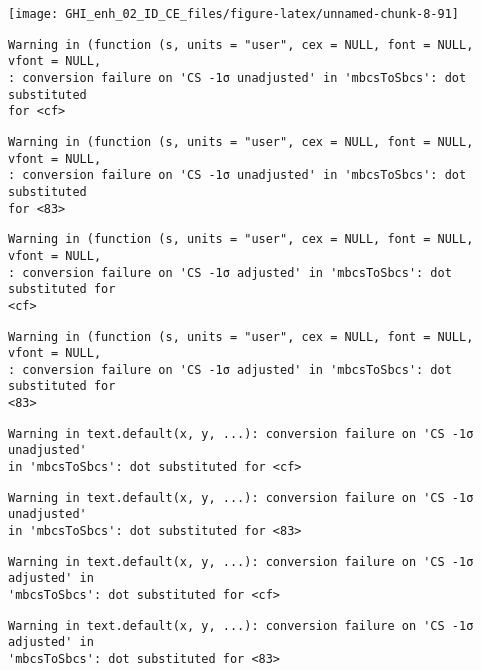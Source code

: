 \documentclass[
  10pt,
  a4paper,oneside]{article}
\begin{document}
\begin{center}\texttt{[image: GHI\_enh\_02\_ID\_CE\_files/figure-latex/unnamed-chunk-8-91]} \end{center}

\begin{verbatim}
Warning in (function (s, units = "user", cex = NULL, font = NULL, vfont = NULL,
: conversion failure on 'CS -1σ unadjusted' in 'mbcsToSbcs': dot substituted
for <cf>
\end{verbatim}

\begin{verbatim}
Warning in (function (s, units = "user", cex = NULL, font = NULL, vfont = NULL,
: conversion failure on 'CS -1σ unadjusted' in 'mbcsToSbcs': dot substituted
for <83>
\end{verbatim}

\begin{verbatim}
Warning in (function (s, units = "user", cex = NULL, font = NULL, vfont = NULL,
: conversion failure on 'CS -1σ adjusted' in 'mbcsToSbcs': dot substituted for
<cf>
\end{verbatim}

\begin{verbatim}
Warning in (function (s, units = "user", cex = NULL, font = NULL, vfont = NULL,
: conversion failure on 'CS -1σ adjusted' in 'mbcsToSbcs': dot substituted for
<83>
\end{verbatim}

\begin{verbatim}
Warning in text.default(x, y, ...): conversion failure on 'CS -1σ unadjusted'
in 'mbcsToSbcs': dot substituted for <cf>
\end{verbatim}

\begin{verbatim}
Warning in text.default(x, y, ...): conversion failure on 'CS -1σ unadjusted'
in 'mbcsToSbcs': dot substituted for <83>
\end{verbatim}

\begin{verbatim}
Warning in text.default(x, y, ...): conversion failure on 'CS -1σ adjusted' in
'mbcsToSbcs': dot substituted for <cf>
\end{verbatim}

\begin{verbatim}
Warning in text.default(x, y, ...): conversion failure on 'CS -1σ adjusted' in
'mbcsToSbcs': dot substituted for <83>
\end{verbatim}
\end{document}
